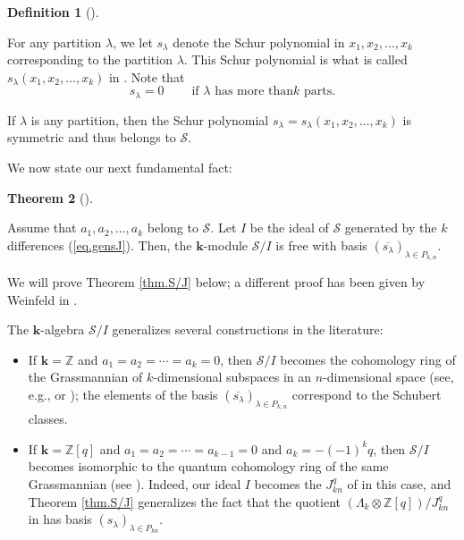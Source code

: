 \documentclass[numbers=enddot,12pt,final,onecolumn,notitlepage]{scrartcl}%
\theoremstyle{definition}
\newtheorem{theo}{Theorem}[section]
\newenvironment{theorem}[1][]
{\begin{theo}[#1]\begin{leftbar}}
{\end{leftbar}\end{theo}}
\newtheorem{defi}[theo]{Definition}
\newenvironment{definition}[1][]
{\begin{defi}[#1]\begin{leftbar}}
{\end{leftbar}\end{defi}}
\begin{document}
\begin{definition}
\label{def.slam}For any partition $\lambda$, we let $s_{\lambda}$ denote the
Schur polynomial in $x_{1},x_{2},\ldots,x_{k}$ corresponding to the partition
$\lambda$. This Schur polynomial is what is called $s_{\lambda}\left(
x_{1},x_{2},\ldots,x_{k}\right)  $ in \cite[Chapter 2]{GriRei18}. Note that%
\begin{equation}
s_{\lambda}=0\ \ \ \ \ \ \ \ \ \ \text{if }\lambda\text{ has more than
}k\text{ parts.} \label{eq.slam=0-too-long}%
\end{equation}

\end{definition}

If $\lambda$ is any partition, then the Schur polynomial $s_{\lambda
}=s_{\lambda}\left(  x_{1},x_{2},\ldots,x_{k}\right)  $ is symmetric and thus
belongs to $\mathcal{S}$.

We now state our next fundamental fact:

\begin{theorem}
\label{thm.S/J}Assume that $a_{1},a_{2},\ldots,a_{k}$ belong to $\mathcal{S}$.
Let $I$ be the ideal of $\mathcal{S}$ generated by the $k$ differences
(\ref{eq.gensJ}). Then, the $\mathbf{k}$-module $\mathcal{S}/I$ is free with
basis $\left(  \overline{s_{\lambda}}\right)  _{\lambda\in P_{k,n}}$.
\end{theorem}

We will prove Theorem \ref{thm.S/J} below; a different proof has been given by
Weinfeld in \cite[Corollary 6.2]{Weinfe19}.

The $\mathbf{k}$-algebra $\mathcal{S}/I$ generalizes several constructions in
the literature:

\begin{itemize}
\item If $\mathbf{k}=\mathbb{Z}$ and $a_{1}=a_{2}=\cdots=a_{k}=0$, then
$\mathcal{S}/I$ becomes the cohomology ring of the Grassmannian of
$k$-dimensional subspaces in an $n$-dimensional space (see, e.g.,
\cite[\S 9.4]{Fulton97} or \cite[Exercise 3.2.12]{Manive01}); the elements of
the basis $\left(  \overline{s_{\lambda}}\right)  _{\lambda\in P_{k,n}}$
correspond to the Schubert classes.

\item If $\mathbf{k}=\mathbb{Z}\left[  q\right]  $ and $a_{1}=a_{2}%
=\cdots=a_{k-1}=0$ and $a_{k}=-\left(  -1\right)  ^{k}q$, then $\mathcal{S}/I$
becomes isomorphic to the quantum cohomology ring of the same Grassmannian
(see \cite{Postni05}). Indeed, our ideal $I$ becomes the $J_{kn}^{q}$ of
\cite[(6)]{Postni05} in this case, and Theorem \ref{thm.S/J} generalizes the
fact that the quotient $\left(  \Lambda_{k}\otimes\mathbb{Z}\left[  q\right]
\right)  /J_{kn}^{q}$ in \cite[(6)]{Postni05} has basis $\left(  s_{\lambda
}\right)  _{\lambda\in P_{kn}}$.
\end{itemize}
\end{document}
